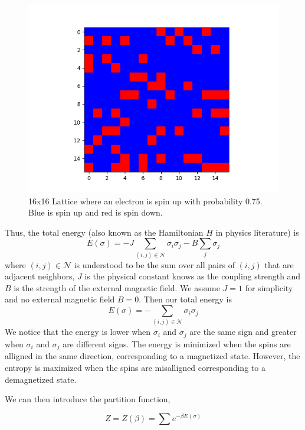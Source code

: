 \documentclass{article}
\begin{document}
    \begin{figure}[ht]
        \includegraphics[width=\columnwidth]{diagrams/16x16_lattice.png}
        \caption{16x16 Lattice where an electron is spin up with probability 0.75. Blue is spin up and red is spin down.}
        \label{fig:4}
    \end{figure}
    
    Thus, the total energy (also known as the Hamiltonian $H$ in physics literature) is
\begin{equation}
    E(\sigma) = - J \sum_{(i,j) \in \mathcal{N}} \sigma_i \sigma_j - B \sum_{j} \sigma_j
\end{equation}
where $(i,j) \in \mathcal{N}$ is understood to be the sum over all pairs of $(i,j)$ that are adjacent neighbors,
$J$ is the physical constant knows as the coupling strength and $B$ is the strength of the external magnetic field.
We assume $J=1$ for simplicity and no external magnetic field $B=0$. Then our total energy is
\begin{equation}
    E(\sigma) = - \sum_{(i,j) \in \mathcal{N}} \sigma_i \sigma_j 
\end{equation} 
We notice that the energy is lower when $\sigma_i$ and $\sigma_j$ are the same sign and greater when $\sigma_i$ and $\sigma_j$ 
are different signs. The energy is minimized when the spins are alligned in the same direction, corresponding to a magnetized state.
However, the entropy is maximized when the spins are misalligned corresponding to a demagnetized state.

We can then introduce the partition function, 

\begin{equation}
    Z = Z(\beta) = \sum e^{-\beta E(\sigma)}
\end{equation}
\end{document}
